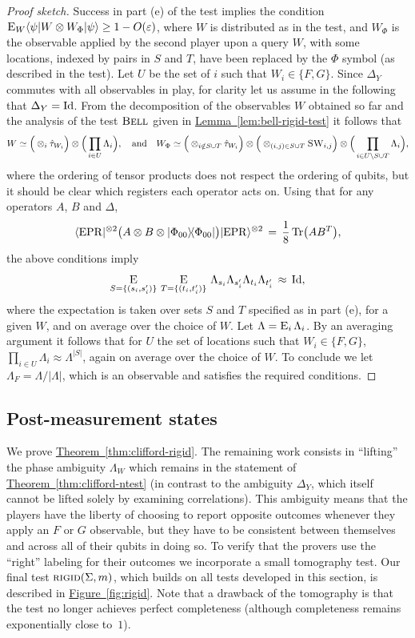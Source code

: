 \documentclass[11pt]{article}
\numberwithin{equation}{section}
\theoremstyle{definition}
\theoremstyle{plain}
\newcommand{\expref}[2]{\hyperref[#2]{#1~\ref{#2}}}
\newcommand{\ket}[1]{|#1\rangle}
\newcommand{\bra}[1]{\langle#1|}
\newcommand{\proj}[1]{\ket{#1}\!\bra{#1}}
\newcommand{\Tr}{\mbox{\rm Tr}}
\newcommand{\Id}{\ensuremath{\mathop{\rm Id}\nolimits}}
\newcommand{\Es}[1]{\ensuremath{\mathop{\textsc{E}}}_{#1}} %
\newcommand{\eps}{\varepsilon}
\newcommand{\EPR}{{\rm EPR}}
\newcommand{\bellt}{\textsc{Bell}}
\newcommand{\rigid}{\textsc{rigid}}
\newcommand{\SWAP}{\textsc{SW}}
\newcommand{\phase}{\Lambda}
\begin{document}
\begin{proof}[Proof sketch]
Success in part (e) of the test implies the condition $ \Es{W} \bra{\psi} W
  \otimes W_\Phi \ket{\psi} \geq 1-O(\eps)$, where $W$ is distributed as in the
  test, and $W_{\Phi}$ is the observable applied by the second player upon a
  query $W$, with some locations, indexed by pairs in $S$ and $T$, have been
  replaced by the $\Phi$ symbol (as described in the test). Let $U$ be the set of $i$ such that $W_i\in \{F,G\}$. Since $\Delta_Y$ commutes with all observables in play, for clarity let us assume in the following that $\Delta_Y = \Id$. 
From the decomposition of the observables $W$ obtained so far and the analysis of the test $\bellt$ given in \expref{Lemma}{lem:bell-rigid-test} it follows that 
$$W \simeq \Big(\otimes_i {\hat{\tau}_{W_i}} \Big)\otimes \Big(\prod_{i\in U} \phase_i\Big),\quad\text{and}\quad W_\Phi \simeq  \Big(\otimes_{i\notin S\cup T} {\hat{\tau}_{W_i}}\Big)\otimes\Big( \otimes_{(i,j)\in S\cup T} \SWAP_{i,j} \Big)\otimes \Big(\prod_{i\in U\backslash S\cup T} \phase_i\Big),$$
where the ordering of tensor products does not respect the ordering of qubits, but it should be clear which registers each operator acts on. Using that for any operators $A$, $B$ and $\Delta$, 
$$\bra{\EPR}^{\otimes 2}  \big(A \otimes B \otimes \proj{\Phi_{00}}\big)\ket{\EPR}^{\otimes 2}  \,=\, \frac{1}{8}\,\Tr\big(AB^T\big) ,$$
the above conditions imply 
$$\Es{S=\{(s_i,s'_i)\}}\, \Es{T=\{(t_i,t'_i)\}} \, \phase_{s_i}\phase_{s'_i} \phase_{t_i}\phase_{t'_i} \,\approx\, \Id,$$
where the expectation is taken over sets $S$ and $T$ specified as in part (e), for a given $W$, and on average over the choice of $W$. Let $\phase = \Es{i} \phase_i$. By an averaging argument it follows that for $U$ the set of locations such that $W_i \in \{F,G\}$, $\prod_{i\in U} \phase_i \approx \phase^{|S|}$, again on average over the choice of $W$. To conclude we let $\phase_F = \phase/|\phase|$, which is an observable and satisfies the required conditions. 
\end{proof}


\subsection{Post-measurement states}
\label{sec: RIGID test}

We prove \expref{Theorem}{thm:clifford-rigid}. The remaining work consists in ``lifting'' the phase ambiguity $\phase_W$ which remains in the statement of \expref{Theorem}{thm:clifford-ntest} (in contrast to the ambiguity $\Delta_Y$, which itself cannot be lifted solely by examining correlations). This ambiguity means that the players have the liberty of choosing to report opposite outcomes whenever they apply an $F$ or $G$ observable, but they have to be consistent between themselves and across all of their qubits in doing so. To verify that the provers use the ``right'' labeling for their outcomes we  incorporate a small tomography test. Our final test  $\rigid(\Sigma,m)$, which builds on all tests developed in this section, is described in \expref{Figure}{fig:rigid}. Note that a drawback of the tomography is that the test no longer achieves perfect completeness (although completeness remains exponentially close to~$1$). 
\end{document}
